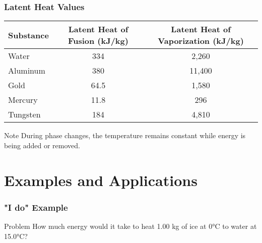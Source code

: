 \documentclass{beamer}
\begin{document}
\begin{frame}
    \frametitle{Latent Heat Values}
    \begin{center}
        \begin{tabular}{|l|c|c|}
            \hline
            \textbf{Substance} & \textbf{Latent Heat of Fusion (kJ/kg)} & \textbf{Latent Heat of Vaporization (kJ/kg)} \\
            \hline
            Water & 334 & 2,260 \\
            \hline
            Aluminum & 380 & 11,400 \\
            \hline
            Gold & 64.5 & 1,580 \\
            \hline
            Mercury & 11.8 & 296 \\
            \hline
            Tungsten & 184 & 4,810 \\
            \hline
        \end{tabular}
    \end{center}
    
    \begin{block}{Note}
        During phase changes, the temperature remains constant while energy is being added or removed.
    \end{block}
\end{frame}

\section{Examples and Applications}

\begin{frame}
    \frametitle{"I do" Example}
    \begin{block}{Problem}
        How much energy would it take to heat 1.00 kg of ice at 0°C to water at 15.0°C?
    \end{block}
    \end{frame}
\end{document}

